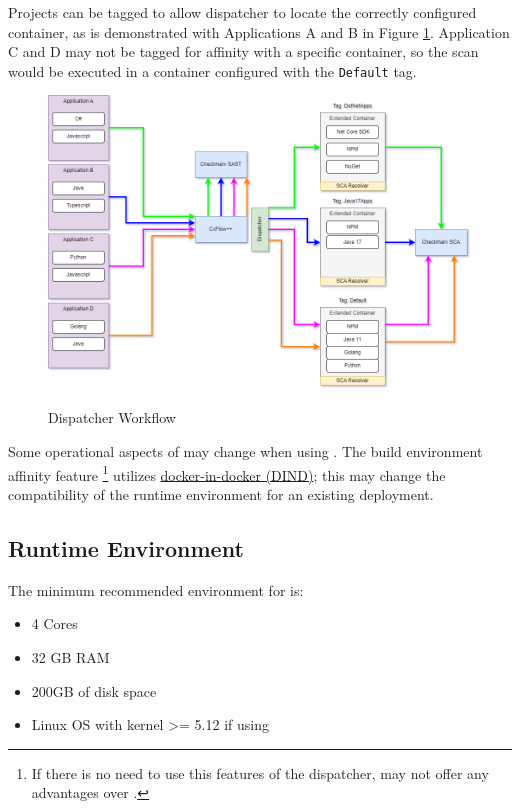 Projects can be tagged to allow dispatcher to locate the correctly configured \scaresolver
container, as is demonstrated with Applications A and B in Figure \ref{fig:dispatcher_workflow}.
Application C and D may not be tagged for affinity with a specific container, so the
\scaresolver scan would be executed in a container configured with the \texttt{Default} tag.

\begin{figure}[h]
    \caption{\cxflowplusplus Dispatcher Workflow}
    \includegraphics[width=\textwidth]{graphics/dispatcher_workflow.png}
    \label{fig:dispatcher_workflow}
\end{figure}


Some operational aspects of \cxflow may change when using \cxflowplusplus.  The \cxflowplusplus 
build environment affinity feature
\footnote{If there is no need to use this features of the dispatcher, \cxflowplusplus may not offer any advantages over \cxflow.} 
utilizes
\href{https://www.docker.com/blog/docker-can-now-run-within-docker/}{docker-in-docker (DIND)}; this may
change the compatibility of the runtime environment for an existing \cxflow deployment.

\subsection{\cxflowplusplus Runtime Environment}

The minimum recommended environment for \cxflowplusplus is:

\begin{itemize}
    \item 4 Cores
    \item 32 GB RAM
    \item 200GB of disk space
    \item Linux OS with kernel >= 5.12 if using \sysbox
\end{itemize}

